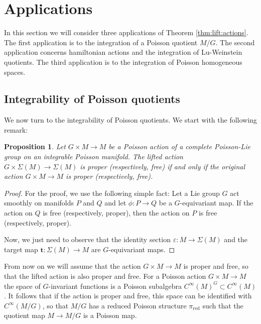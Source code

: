 \documentclass[a4paper,11pt]{amsart}
\newtheorem{prop}[thm]{Proposition}
\theoremstyle{definition}
\theoremstyle{remark}
\begin{document}
\section{Applications}              \label{sec:applications}            
In this section we will consider three applications of Theorem
\ref{thm:lift:actions}. The first application is to the
integration of a Poisson quotient $M/G$. The second application
concerns hamiltonian actions and the integration of
Lu-Weinstein quotients. The third application is to the
integration of Poisson homogeneous spaces.

\subsection{Integrability of Poisson quotients}                \label{subsec:quotients}                                       
We now turn to the integrability of Poisson quotients. We start with the following remark:

\begin{prop}
\label{lift:actions:proper}
Let $G\times M\to M$ be a Poisson action of a complete Poisson-Lie group
on an integrable Poisson manifold. The lifted action $G\times\Sigma(M)\to
\Sigma(M)$ is proper (respectively, free) if and only if the
original action $G\times M\to M$ is proper (respectively, free).
\end{prop}

\begin{proof}
For the proof, we use the following simple fact: Let a Lie group $G$ act
smoothly on manifolds $P$ and $Q$ and let $\phi:P\to Q$ be a $G$-equivariant map.
If the action on $Q$ is free (respectively, proper), then the action on $P$ is free
(respectively, proper).

Now, we just need to observe that the identity section ${\varepsilon}:M\to\Sigma(M)$ and the
target map ${\mathbf{t}}:\Sigma(M)\to M$ are $G$-equivariant maps.
\end{proof}

From now on we will assume that the action $G\times M\to M$ is proper and free, so that the
lifted action is also proper and free. For a Poisson action $G\times M\to M$
the space of $G$-invariant functions is a Poisson subalgebra $C^\infty(M)^G\subset C^\infty(M)$. It follows
that if the action is proper and free, this space can be identified with $C^\infty(M/G)$, so
that $M/G$ has a reduced Poisson structure $\pi_\text{red}$ such that the quotient map $M\to M/G$ is
a Poisson map.
\end{document}
